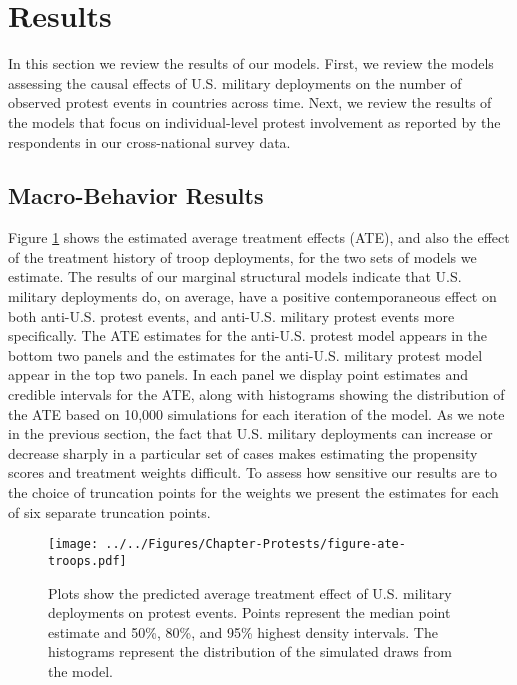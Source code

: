 \section*{Results}

In this section we review the results of our models. First, we review the models assessing the causal effects of U.S. military deployments on the number of observed protest events in countries across time. Next, we review the results of the models that focus on individual-level protest involvement as reported by the respondents in our cross-national survey data.


\subsection*{Macro-Behavior Results}

 Figure \ref{fig:atetroops} shows the estimated average treatment effects (ATE), and also the effect of the treatment history of troop deployments, for the two sets of models we estimate. The results of our marginal structural models indicate that U.S. military deployments do, on average, have a positive contemporaneous effect on both anti-U.S. protest events, and anti-U.S. military protest events more specifically. The ATE estimates for the anti-U.S. protest model appears in the bottom two panels and the estimates for the anti-U.S. military protest model appear in the top two panels. In each panel we display point estimates and credible intervals for the ATE, along with histograms showing the distribution of the ATE based on 10,000 simulations for each iteration of the model. As we note in the previous section, the fact that U.S. military deployments can increase or decrease sharply in a particular set of cases makes estimating the propensity scores and treatment weights difficult. To assess how sensitive our results are to the choice of truncation points for the weights we present the estimates for each of six separate truncation points. 


\begin{figure}[t]
	\centering\texttt{[image: ../../Figures/Chapter-Protests/figure-ate-troops.pdf]}
	\caption{Plots show the predicted average treatment effect of U.S. military deployments on protest events. Points represent the median point estimate and 50\%, 80\%, and 95\% highest density intervals. The histograms represent the distribution of the simulated draws from the model.}
	\label{fig:atetroops}
\end{figure}

